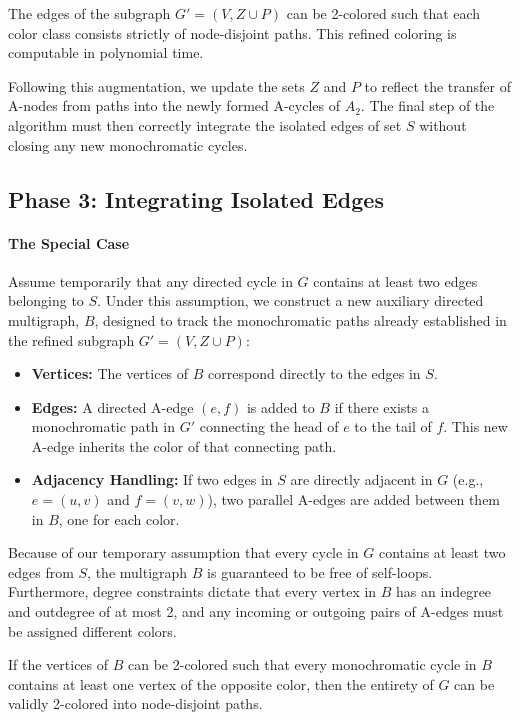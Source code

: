 \begin{lemma} \label{lemma:refined_coloring}
The edges of the subgraph $G' = (V, Z \cup P)$ can be 2-colored such that each
color class consists strictly of node-disjoint paths. This refined coloring is
computable in polynomial time.
\end{lemma}

Following this augmentation, we update the sets $Z$ and $P$ to reflect the
transfer of A-nodes from paths into the newly formed A-cycles of $A_2$. The
final step of the algorithm must then correctly integrate the isolated edges of
set $S$ without closing any new monochromatic cycles.

\subsection{Phase 3: Integrating Isolated Edges}
\paragraph{The Special Case}
Assume temporarily that any directed cycle in $G$ contains at least two edges
belonging to $S$. Under this assumption, we construct a new auxiliary directed
multigraph, $B$, designed to track the monochromatic paths already established
in the refined subgraph $G' = (V, Z \cup P)$:
\begin{itemize}
    \item \textbf{Vertices:} The vertices of $B$ correspond directly to the
    edges in $S$.
    \item \textbf{Edges:} A directed A-edge $(e, f)$ is added to $B$ if there
    exists a monochromatic path in $G'$ connecting the head of $e$ to the tail
    of $f$. This new A-edge inherits the color of that connecting path.
    \item \textbf{Adjacency Handling:} If two edges in $S$ are directly adjacent
    in $G$ (e.g., $e = (u, v)$ and $f = (v, w)$), two parallel A-edges are added
    between them in $B$, one for each color.
\end{itemize}

Because of our temporary assumption that every cycle in $G$ contains at least
two edges from $S$, the multigraph $B$ is guaranteed to be free of self-loops.
Furthermore, degree constraints dictate that every vertex in $B$ has an indegree
and outdegree of at most 2, and any incoming or outgoing pairs of A-edges must
be assigned different colors.

\begin{lemma} \label{lemma:b_coloring}
If the vertices of $B$ can be 2-colored such that every monochromatic cycle in
$B$ contains at least one vertex of the opposite color, then the entirety of $G$
can be validly 2-colored into node-disjoint paths.
\end{lemma}

